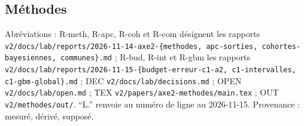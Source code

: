 \begingroup\sloppy %
\subsection{Méthodes}
\label{met:ann}
Abréviations : R-meth, R-apc, R-coh et R-com désignent les rapports
\texttt{v2/docs/lab/reports/2026-11-14-axe2-\{methodes, apc-sorties, cohortes-bayesiennes, communes\}.md} ;
R-bud, R-int et R-gbm les rapports
\texttt{v2/docs/lab/reports/2026-11-15-\{budget-erreur-c1-a2, c1-intervalles, c1-gbm-global\}.md} ;
DEC \texttt{v2/docs/lab/decisions.md} ; OPEN \texttt{v2/docs/lab/open.md} ; TEX
\texttt{v2/papers/axe2-methodes/main.tex} ; OUT \texttt{v2/methodes/out/}. \enquote{L.} renvoie au numéro de
ligne au 2026-11-15. Provenance : \mesure{} mesuré, \derive{} dérivé, \suppose{} supposé.

